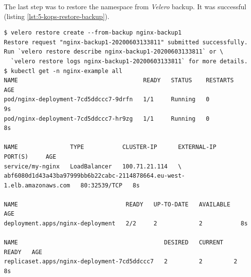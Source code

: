The last step was to restore the namespace from \textit{Velero} backup. It was successful (listing \ref{lst:5-kops-restore-backup}).
\begin{lstlisting}[basicstyle=\scriptsize,xleftmargin=0cm,label=lst:5-kops-restore-backup,caption={Restoring the backup}]
$ velero restore create --from-backup nginx-backup1
Restore request "nginx-backup1-20200603133811" submitted successfully.
Run `velero restore describe nginx-backup1-20200603133811` or \
  `velero restore logs nginx-backup1-20200603133811` for more details.
$ kubectl get -n nginx-example all
NAME                                    READY   STATUS    RESTARTS   AGE
pod/nginx-deployment-7cd5ddccc7-9drfn   1/1     Running   0          9s
pod/nginx-deployment-7cd5ddccc7-hr9zg   1/1     Running   0          8s

NAME               TYPE           CLUSTER-IP      EXTERNAL-IP   PORT(S)     AGE
service/my-nginx   LoadBalancer   100.71.21.114   \
abf6080d1d43a43ba97999bb6b22cabc-2114878664.eu-west-1.elb.amazonaws.com   80:32539/TCP   8s

NAME                               READY   UP-TO-DATE   AVAILABLE   AGE
deployment.apps/nginx-deployment   2/2     2            2           8s

NAME                                          DESIRED   CURRENT   READY   AGE
replicaset.apps/nginx-deployment-7cd5ddccc7   2         2         2       8s
\end{lstlisting}


